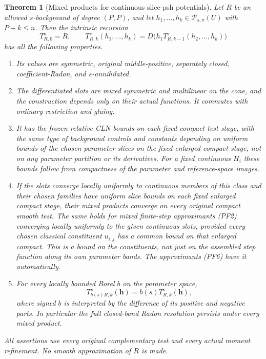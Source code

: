 \documentclass[11pt,a4paper]{article}
\numberwithin{equation}{section}
\newtheorem{theorem}{Theorem}[section]
\theoremstyle{definition}
\theoremstyle{remark}
\begin{document}
\begin{theorem}[Mixed products for continuous slice-psh potentials]
\label{thm:r12-parameter-family-bt-calculus}
Let $R$ be an allowed $s$-background of degree $(P,P)$, and let
$h_1,\ldots,h_k\in\mathcal P_{s,\pi}(U)$ with $P+k\le n$.
Then the intrinsic recursion
\[
 T^s_{R,0}=R,\qquad
 T^s_{R,k}(h_1,\ldots,h_k)
                  =D\bigl(h_1T^s_{R,k-1}(h_2,\ldots,h_k)\bigr)
 \tag{PF4}
\]
has all the following properties.
\begin{enumerate}
\item Its values are symmetric, original middle-positive,
separately closed, coefficient-Radon, and $s$-annihilated.
\item The differentiated slots are mixed symmetric and multilinear
on the cone, and the construction depends only on their actual
functions. It commutes with ordinary restriction and gluing.
\item It has the frozen relative CLN bounds on each fixed compact
test stage, with the same type of background controls and constants
depending on uniform bounds of the chosen parameter slices on the
fixed enlarged compact stage, not on any parameter partition or
its derivatives. For a fixed continuous $H_i$ these bounds follow
from compactness of the parameter and reference-space images.
\item If the slots converge locally uniformly to continuous
members of this class and their chosen families have uniform slice
bounds on each fixed enlarged compact stage, their mixed products
converge on every original compact smooth test. The same holds for
mixed finite-step approximants (PF2) converging locally uniformly to
the given continuous slots, provided every chosen classical
constituent $u_{i,j}$ has a common bound on that enlarged compact.
This is a bound on the constituents, not just on the assembled
step function along its own parameter bands. The approximants (PF6)
have it automatically.
\item For every locally bounded Borel $b$ on the parameter space,
\[
            T^s_{b(s)R,k}(\mathbf h)=b(s)T^s_{R,k}(\mathbf h),
 \tag{PF5}
\]
where signed $b$ is interpreted by the difference of its positive
and negative parts. In particular the full closed-band Radon
resolution persists under every mixed product.
\end{enumerate}
All assertions use every original complementary test and every
actual moment refinement. No smooth approximation of $R$ is made.
\end{theorem}
\end{document}
